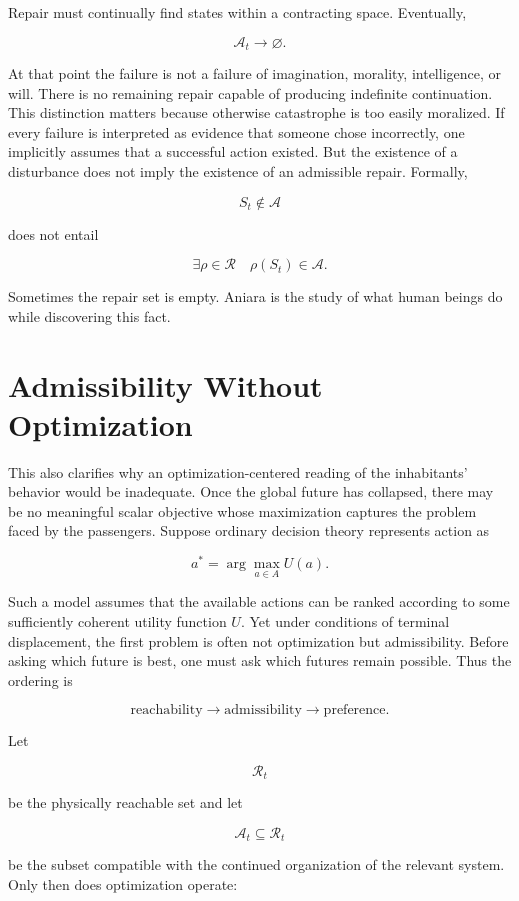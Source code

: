 \documentclass[11pt,oneside]{book}
\theoremstyle{definition}
\theoremstyle{remark}
\begin{document}
Repair must continually find states within a contracting space. Eventually,

\[
\mathcal{A}_t\rightarrow\varnothing.
\]

At that point the failure is not a failure of imagination, morality, intelligence, or will. There is
no remaining repair capable of producing indefinite continuation. This distinction matters because
otherwise catastrophe is too easily moralized. If every failure is interpreted as evidence that
someone chose incorrectly, one implicitly assumes that a successful action existed. But the
existence of a disturbance does not imply the existence of an admissible repair. Formally,

\[
S_t\notin\mathcal{A}
\]

does not entail

\[
\exists\rho\in\mathcal{R} \quad \rho(S_t)\in\mathcal{A}.
\]

Sometimes the repair set is empty. Aniara is the study of what human beings do while discovering
this fact.

\section{Admissibility Without Optimization}

This also clarifies why an optimization-centered reading of the inhabitants' behavior would be
inadequate. Once the global future has collapsed, there may be no meaningful scalar objective whose
maximization captures the problem faced by the passengers. Suppose ordinary decision theory
represents action as

\[
a^* = \arg\max_{a\in A}U(a).
\]

Such a model assumes that the available actions can be ranked according to some sufficiently
coherent utility function \(U\). Yet under conditions of terminal displacement, the first problem is
often not optimization but admissibility. Before asking which future is best, one must ask which
futures remain possible. Thus the ordering is

\[
\text{reachability} \rightarrow \text{admissibility} \rightarrow \text{preference}.
\]

Let

\[
\mathcal{R}_t
\]

be the physically reachable set and let

\[
\mathcal{A}_t\subseteq\mathcal{R}_t
\]

be the subset compatible with the continued organization of the relevant system. Only then does
optimization operate:
\end{document}
